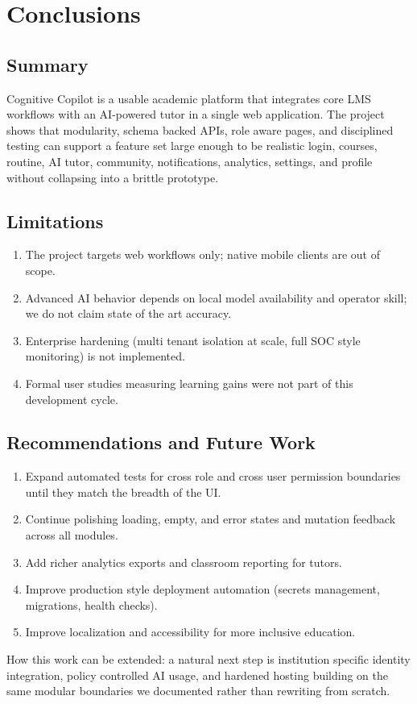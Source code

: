 \chapter{Conclusions}

\section{Summary}
Cognitive Copilot is a usable academic platform that integrates core LMS workflows with an AI-powered tutor in a single web application. The project shows that modularity, schema backed APIs, role aware pages, and disciplined testing can support a feature set large enough to be realistic login, courses, routine, AI tutor, community, notifications, analytics, settings, and profile without collapsing into a brittle prototype.

\section{Limitations}
\begin{enumerate}[label=\arabic*.]
\item The project targets web workflows only; native mobile clients are out of scope.
\item Advanced AI behavior depends on local model availability and operator skill; we do not claim state of the art accuracy.
\item Enterprise hardening (multi tenant isolation at scale, full SOC style monitoring) is not implemented.
\item Formal user studies measuring learning gains were not part of this development cycle.
\end{enumerate}

\section{Recommendations and Future Work}
\begin{enumerate}[label=\arabic*.]
\item Expand automated tests for cross role and cross user permission boundaries until they match the breadth of the UI.
\item Continue polishing loading, empty, and error states and mutation feedback across all modules.
\item Add richer analytics exports and classroom reporting for tutors.
\item Improve production style deployment automation (secrets management, migrations, health checks).
\item Improve localization and accessibility for more inclusive education.
\end{enumerate}

How this work can be extended: a natural next step is institution specific identity integration, policy controlled AI usage, and hardened hosting building on the same modular boundaries we documented rather than rewriting from scratch.
